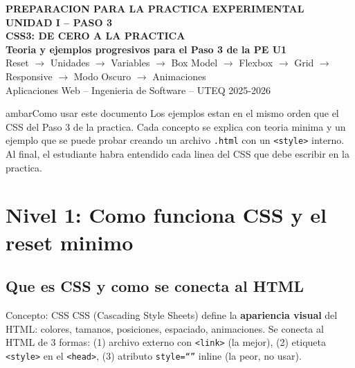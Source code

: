 \documentclass[11pt,a4paper]{article}
\begin{document}
	
	\begin{cajabanda}
		\begin{center}
			{\scriptsize\bfseries PREPARACION PARA LA PRACTICA EXPERIMENTAL UNIDAD I -- PASO 3}\\[5pt]
			{\LARGE\bfseries CSS3: DE CERO A LA PRACTICA}\\[3pt]
			{\large\bfseries Teoria y ejemplos progresivos para el Paso 3 de la PE U1}\\[3pt]
			{\normalsize Reset $\to$ Unidades $\to$ Variables $\to$ Box Model $\to$ Flexbox $\to$ Grid $\to$ Responsive $\to$ Modo Oscuro $\to$ Animaciones}\\[5pt]
			{\small Aplicaciones Web -- Ingenieria de Software -- UTEQ 2025-2026}
		\end{center}
	\end{cajabanda}
	
	\vspace{0.3cm}
	
	\begin{cajatip}{ambar}{Como usar este documento}
		Los ejemplos estan en el mismo orden que el CSS del Paso 3 de la practica. Cada concepto se explica con teoria minima y un ejemplo que se puede probar creando un archivo \texttt{.html} con un \texttt{<style>} interno. Al final, el estudiante habra entendido cada linea del CSS que debe escribir en la practica.
	\end{cajatip}
	
	\vspace{0.3cm}
	\tableofcontents
	\vspace{0.5cm}
	
	\section{Nivel 1: Como funciona CSS y el reset minimo}
	
	\subsection{Que es CSS y como se conecta al HTML}
	
	\begin{cajaconcepto}{Concepto: CSS}
		CSS (Cascading Style Sheets) define la \textbf{apariencia visual} del HTML: colores, tamanos, posiciones, espaciado, animaciones. Se conecta al HTML de 3 formas: (1) archivo externo con \texttt{<link>} (la mejor), (2) etiqueta \texttt{<style>} en el \texttt{<head>}, (3) atributo \texttt{style=``''} inline (la peor, no usar).
	\end{cajaconcepto}
	
\end{document}
